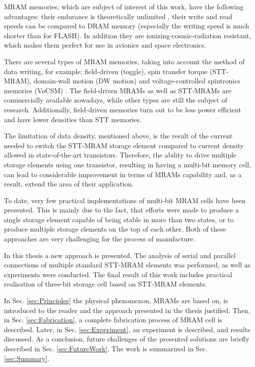     MRAM memories, which are subject of interest of this work, have the following advantages: their endurance is theoretically unlimited \cite{kent2015new}, their write and read speeds can be compared to DRAM memory (especially the writing speed is much shorter than for FLASH). In addition they are ionizing-cosmic-radiation resistant, which makes them perfect for use in avionics and space electronics. 
    
    There are several types of MRAM memories, taking into account the method of data writing, for example: field-driven (toggle), spin transfer torque (STT-MRAM), domain-wall motion (DW motion) and voltage-controlled spintronics memories (VoCSM) \cite{yoda2016voltage}. The field-driven MRAMs as well as STT-MRAMs are commercially available nowadays, while other types are still the subject of research. Additionally, field-driven memories turn out to be less power efficient and have lower densities than STT memories.
    
    The limitation of data density, mentioned above, is the result of the current needed to switch the STT-MRAM storage element compared to current density allowed in state-of-the-art transistors. Therefore, the ability to drive multiple storage elements using one transistor, resulting in having a multi-bit memory cell, can lead to considerable improvement in terms of MRAMs capability and, as a result, extend the area of their application.
    
    To date, very few practical implementations of multi-bit MRAM cells have been presented. This is mainly due to the fact, that efforts were made to produce a single storage element capable of being stable in more than two states, or to produce multiple storage elements on the top of each other. Both of these approaches are very challenging for the process of manufacture.
    
    In this thesis a new approach is presented. The analysis of serial and parallel connections of multiple standard STT-MRAM elements was performed, as well as experiments were conducted. The final result of this work includes practical realisation of three-bit storage cell based on STT-MRAM elements.
    
    In Sec. \ref{sec:Principles} the physical phenomenon, MRAMs are based on, is introduced to the reader and the approach presented in the thesis justified. Then, in Sec. \ref{sec:Fabrication}, a complete fabrication process of MRAM cell is described. Later, in Sec. \ref{sec:Experiment}, an experiment is described, and results discussed. As a conclusion, future challenges of the presented solutions are briefly described in Sec. \ref{sec:FutureWork}. The work is summarized in Sec. \ref{sec:Summary}.
